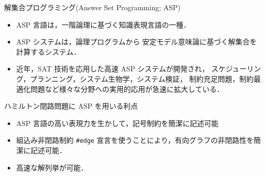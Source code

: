 \documentclass[dvipdfmx,10pt]{beamer}
\begin{document}
\begin{frame}{解集合プログラミング(Answer Set Programming; ASP)}
  \begin{itemize}
  \item \alert{ASP 言語}は，一階論理に基づく知識表現言語の一種．
  \item \alert{ASP システム}は，論理プログラムから
    安定モデル意味論に基づく解集合を計算するシステム．
  \item 近年，SAT 技術を応用した高速 ASP システムが開発され，
    スケジューリング，プランニング，システム生物学，システム検証，
    制約充足問題，制約最適化問題など様々な分野への実用的応用が急速に拡大している．
  \end{itemize}

  \begin{alertblock}{ハミルトン閉路問題に ASP を用いる利点}
    \begin{itemize}
    \item ASP 言語の高い表現力を生かして，記号制約を簡潔に記述可能
    \item 組込み非閉路制約 \texttt{\#edge} 宣言を使うことにより，有向グラフの非閉路性を簡潔に記述可能．
    \item 高速な解列挙が可能．
    \end{itemize}
  \end{alertblock}
\end{frame}
\end{document}
